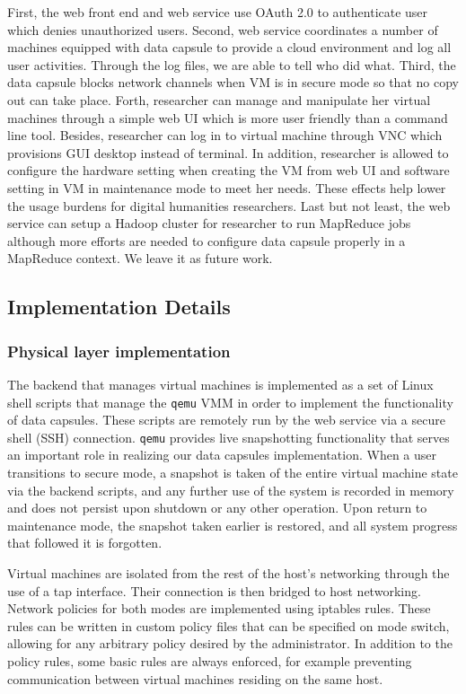 \documentclass{acm_proc_article-sp}
\begin{document}
First, the web front end and web service use OAuth 2.0 to authenticate user which denies unauthorized users. Second, web service coordinates a number of machines equipped with data capsule to provide a cloud environment and log all user activities. Through the log files, we are able to tell who did what. Third, the data capsule blocks network channels when VM is in secure mode so that no copy out can take place. Forth, researcher can manage and manipulate her virtual machines through a simple web UI which is more user friendly than a command line tool. Besides, researcher can log in to virtual machine through VNC which provisions GUI desktop instead of terminal. In addition, researcher is allowed to configure the hardware setting when creating the VM from web UI and software setting in VM in maintenance mode to meet her needs. These effects help lower the usage burdens for digital humanities researchers. Last but not least, the web service can setup a Hadoop cluster for researcher to run MapReduce jobs although more efforts are needed to configure data capsule properly in a MapReduce context. We leave it as future work.

\subsection{Implementation Details}

\subsubsection{Physical layer implementation}

The backend that manages virtual machines is implemented as a set of Linux
shell scripts that manage the \texttt{qemu} VMM in order to implement the
functionality of data capsules.  These scripts are remotely run by the web
service via a secure shell (SSH) connection.  \texttt{qemu} provides live
snapshotting functionality that serves an important role in realizing our
data capsules implementation.  When a user transitions to secure mode, a
snapshot is taken of the entire virtual machine state via the backend scripts,
and any further use of the system is recorded in memory and does not persist
upon shutdown or any other operation.  Upon return to maintenance mode, the
snapshot taken earlier is restored, and all system progress that followed it is
forgotten.

Virtual machines are isolated from the rest of the host's networking through the
use of a tap interface.  Their connection is then bridged to host networking.
Network policies for both modes are implemented using iptables rules.  These
rules can be written in custom policy files that can be specified on mode
switch, allowing for any arbitrary policy desired by the administrator.  In
addition to the policy rules, some basic rules are always enforced, for example
preventing communication between virtual machines residing on the same host.
\end{document}

